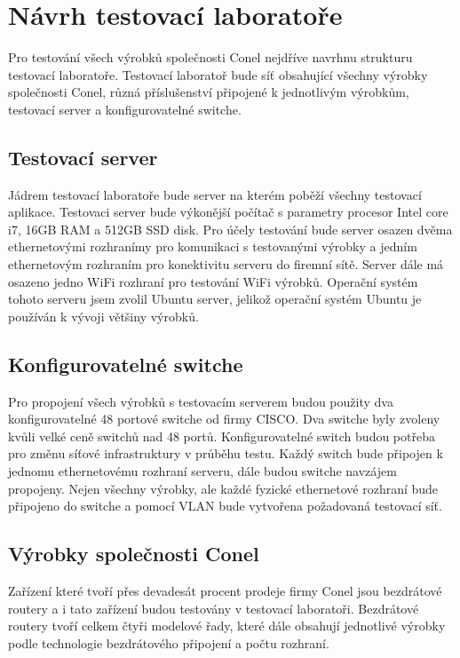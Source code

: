 \chapter{Návrh testovací laboratoře}

Pro testování všech výrobků společnosti Conel nejdříve navrhnu strukturu testovací laboratoře.  Testovací laboratoř bude síť obsahující všechny výrobky společnosti Conel, různá příslušenství připojené k jednotlivým výrobkům, testovací server a konfigurovatelné switche.

\section{Testovací server}
Jádrem testovací laboratoře bude server na kterém poběží všechny testovací aplikace. Testovaci server bude výkonější počítač s parametry procesor Intel core i7, 16GB RAM a 512GB SSD disk. Pro účely testování bude server osazen dvěma ethernetovými rozhranímy pro komunikaci s testovanými výrobky a jedním ethernetovým rozhraním pro konektivitu serveru do firemní sítě. Server dále má osazeno jedno WiFi rozhraní pro testování WiFi výrobků.  Operační systém tohoto serveru jsem zvolil Ubuntu server, jelikož operační systém Ubuntu je používán k vývoji většiny výrobků.

\section{Konfigurovatelné switche}
Pro propojení všech výrobků s testovacím serverem budou použity dva konfigurovatelné 48 portové switche od firmy CISCO. Dva switche byly zvoleny kvůli velké ceně switchů nad 48 portů. Konfigurovatelné switch budou potřeba pro změnu síťové infrastruktury v průběhu testu. Každý switch bude připojen k jednomu ethernetovému rozhraní serveru, dále budou switche navzájem propojeny. Nejen všechny výrobky, ale každé fyzické ethernetové rozhraní bude připojeno do switche a pomocí VLAN bude vytvořena požadovaná testovací síť.

\section{Výrobky společnosti Conel}
Zařízení které tvoří přes devadesát procent prodeje firmy Conel jsou bezdrátové routery a i tato zařízení budou testovány v testovací laboratoři. Bezdrátové routery tvoří celkem čtyři modelové řady, které dále obsahují jednotlivé výrobky podle technologie bezdrátového připojení a počtu rozhraní.

